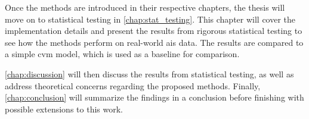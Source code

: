 Once the methods are introduced in their respective chapters, the thesis will move on to statistical testing in \cref{chap:stat_testing}. This chapter will cover the implementation details and present the results from rigorous statistical testing to see how the methods perform on real-world \acrshort{ais} data. The results are compared to a simple \acrshort{cvm} model, which is used as a baseline for comparison. 

\cref{chap:discussion} will then discuss the results from statistical testing, as well as address theoretical concerns regarding the proposed methods. 
Finally, \cref{chap:conclusion} will summarize the findings in a conclusion before finishing with possible extensions to this work.



